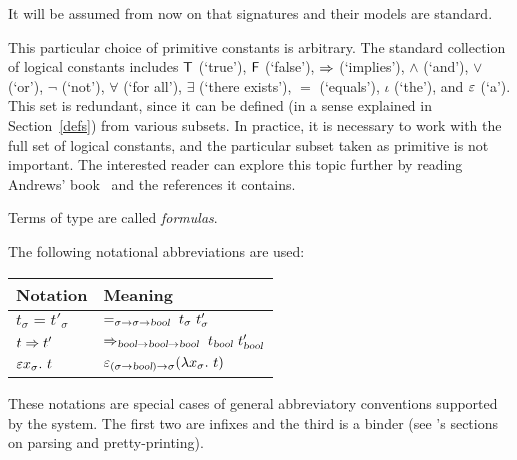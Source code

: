 It will be assumed from now on that signatures and their models are
standard.

\medskip

This particular choice of primitive constants is arbitrary.  The
standard collection of logical constants includes ${\sf T}$ (`true'), ${\sf F}$
(`false'), $\Rightarrow$ (`implies'), $\wedge$ (`and'), $\vee$
(`or'), $\neg$ (`not'), $\forall$ (`for all'), $\exists$ (`there
exists'), $=$ (`equals'), $\iota$ (`the'), and $\varepsilon$ (`a'). This
set is redundant, since it can be defined (in a sense explained in
Section~\ref{defs}) from various subsets. In practice, it is
necessary to work with the full set of logical constants, and the
particular subset taken as primitive is not important. The interested
reader can explore this topic  further by reading Andrews'
book~\cite{Andrews} and the references it contains.

\medskip

Terms of type  are  called {\it formulas\/}.

The following notational abbreviations are used:

\begin{center}
\begin{tabular}{|l|l|}\hline
{\rm Notation} & {\rm Meaning}\\ \hline
$t_{\sigma}=t'_{\sigma}$ &
  $=_{\sigma\fun\sigma\fun\ty{bool}}\ t_{\sigma}\ t'_{\sigma}$\\ \hline
$t\Rightarrow t'$ &
  $\imp_{\ty{bool}\fun\ty{bool}\fun\ty{bool}}\ t_\ty{bool}\
t'_\ty{bool}$\\ \hline
$\varepsilon x_{\sigma}.\ t$ &
  $ \varepsilon_{(\sigma{\to}\textsl{bool}){\to}\sigma}
(\lambda x_{\sigma}.\ t)$\\ \hline
\end{tabular}
\end{center}
These notations are special cases of general abbreviatory conventions
supported by the \HOL{} system. The first two are infixes and the
third is a binder (see \DESCRIPTION's sections on parsing and
pretty-printing).



